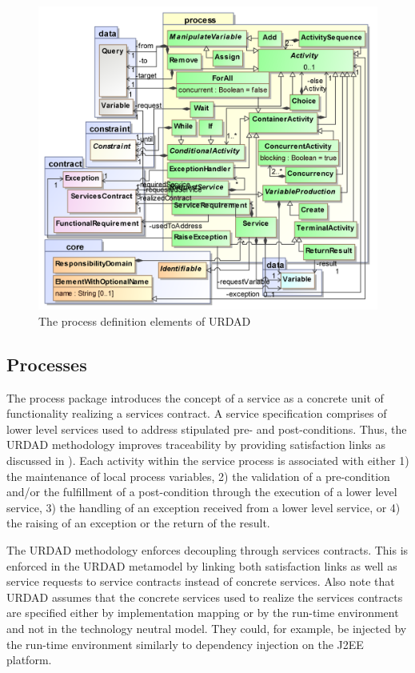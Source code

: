 \begin{figure}[Htbp]
  \centering
  \includegraphics{process}
  \caption{The process definition elements of URDAD}
  \label{fig:metamodel}
\end{figure}

\subsection{Processes}

The process package introduces the concept of a service as a concrete unit of functionality realizing a services contract. A service specification comprises of lower level services used to address stipulated pre- and post-conditions. Thus, the URDAD methodology improves traceability by providing satisfaction links as discussed in \cite{ramesh_toward_2001}). Each activity within the service process is associated with either 1) the maintenance of local process variables, 2) the validation of a pre-condition and/or the fulfillment of a post-condition through the execution of a lower level service, 3) the handling of an exception received from a lower level service, or 4) the raising of an exception or the return of the result.

The URDAD methodology enforces decoupling through services contracts. This is enforced in the URDAD metamodel by linking both satisfaction links as well as service requests to service contracts instead of concrete services. Also note that URDAD assumes that the concrete services used to realize the services contracts are specified either by implementation mapping or by the run-time environment and not in the technology neutral model. They could, for example, be injected by the run-time environment similarly to dependency injection on the J2EE platform.

